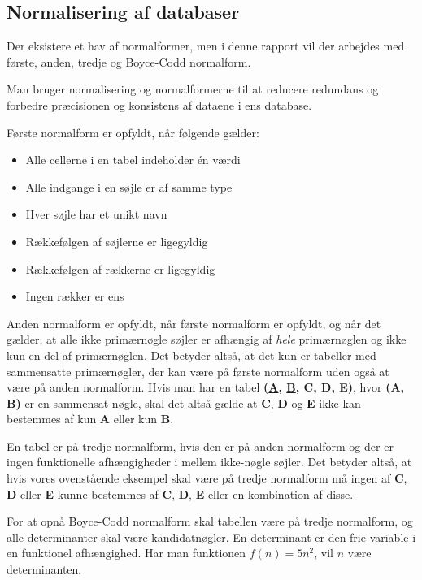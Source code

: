 {\newpage
\subsection{Normalisering af databaser}
\label{bilag:normalisering}
Der eksistere et hav af normalformer, men i denne rapport vil der arbejdes med første, anden, tredje og Boyce-Codd normalform.

Man bruger normalisering og normalformerne til at reducere redundans og forbedre præcisionen og konsistens af dataene i ens database.

Første normalform er opfyldt, når følgende gælder:
\begin{itemize}
    \item Alle cellerne i en tabel indeholder én værdi
    \item Alle indgange i en søjle er af samme type
    \item Hver søjle har et unikt navn
    \item Rækkefølgen af søjlerne er ligegyldig
    \item Rækkefølgen af rækkerne er ligegyldig
    \item Ingen rækker er ens
\end{itemize}

Anden normalform er opfyldt, når første normalform er opfyldt, og når det gælder, at alle ikke primærnøgle søjler er afhængig af \textit{hele} primærnøglen og ikke kun en del af primærnøglen.
Det betyder altså, at det kun er tabeller med sammensatte primærnøgler, der kan være på første normalform uden også at være på anden normalform. Hvis man har en tabel \textbf{(\underline{A}, \underline{B}, C, D, E)}, hvor \textbf{(A, B)} er en sammensat nøgle, skal det altså gælde at \textbf{C}, \textbf{D} og \textbf{E} ikke kan bestemmes af kun \textbf{A} eller kun \textbf{B}.

En tabel er på tredje normalform, hvis den er på anden normalform og der er ingen funktionelle afhængigheder i mellem ikke-nøgle søjler.
Det betyder altså, at hvis vores ovenstående eksempel skal være på tredje normalform må ingen af \textbf{C}, \textbf{D} eller \textbf{E} kunne bestemmes af \textbf{C}, \textbf{D}, \textbf{E} eller en kombination af disse.

For at opnå Boyce-Codd normalform skal tabellen være på tredje normalform, og alle determinanter skal være kandidatnøgler.
En determinant er den frie variable i en funktionel afhængighed. Har man funktionen \(f(n) = 5n^2 \), vil \(n\) være determinanten.\cite{database}

}
